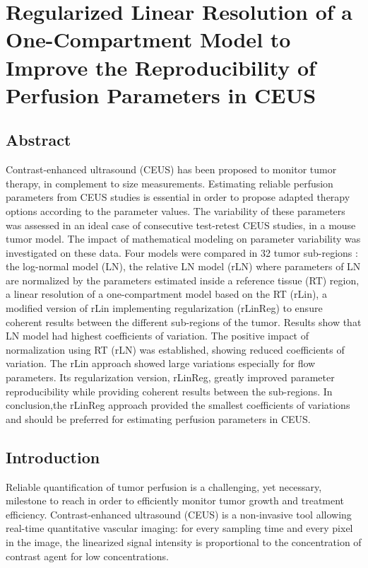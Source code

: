\chapter{Regularized Linear Resolution of a One-Compartment Model to Improve the Reproducibility of Perfusion Parameters in CEUS}\label{chapter:IUS}

\section{Abstract}
Contrast-enhanced ultrasound (CEUS) has been proposed to monitor tumor therapy, in complement to size measurements. Estimating reliable perfusion parameters from CEUS studies is essential in order to propose adapted therapy options according to the parameter values. The variability of these parameters was assessed in an ideal case of consecutive test-retest CEUS studies, in a mouse tumor model. The impact of mathematical modeling on parameter variability was investigated on these data. Four models were compared in 32 tumor sub-regions : the log-normal model (LN), the relative LN model (rLN) where parameters of LN are normalized by the parameters estimated inside a reference tissue (RT) region, a linear resolution of a one-compartment model based on the RT (rLin), a modified version of rLin implementing  regularization (rLinReg) to ensure coherent results between the different sub-regions of the tumor. Results show that LN model had highest coefficients of variation. The positive impact of normalization using RT (rLN) was established, showing reduced coefficients of variation. The rLin approach showed large variations especially for flow parameters. Its regularization version, rLinReg, greatly improved parameter reproducibility while providing coherent results between the sub-regions. In conclusion,the rLinReg approach provided the smallest coefficients of variations and should be preferred for estimating perfusion parameters in CEUS.


\section{Introduction}
Reliable quantification of tumor perfusion is a challenging, yet necessary, milestone to reach in order to efficiently monitor tumor growth and treatment efficiency.
Contrast-enhanced ultrasound (CEUS) is a non-invasive tool allowing real-time quantitative vascular imaging: for every sampling time and every pixel in the image, the linearized signal intensity is proportional to the concentration of contrast agent for low concentrations.

